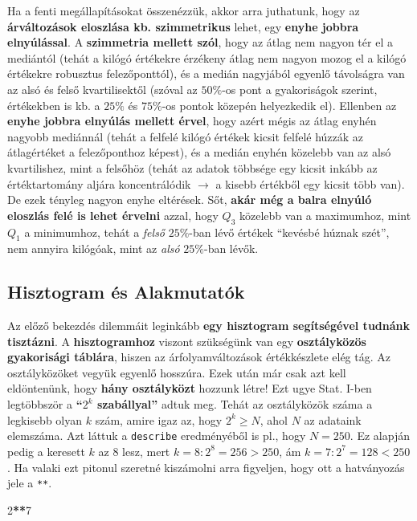 \documentclass[
]{book}
\newenvironment{Shaded}{\begin{snugshade}}{\end{snugshade}}
\newcommand{\DecValTok}[1]{\textcolor[rgb]{0.00,0.00,0.81}{#1}}
\newcommand{\OperatorTok}[1]{\textcolor[rgb]{0.81,0.36,0.00}{\textbf{#1}}}
\begin{document}
Ha a fenti megállapításokat összenézzük, akkor arra juthatunk, hogy az \textbf{árváltozások eloszlása kb. szimmetrikus} lehet, egy \textbf{enyhe jobbra elnyúlással}. A \textbf{szimmetria mellett szól}, hogy az átlag nem nagyon tér el a mediántól (tehát a kilógó értékekre érzékeny átlag nem nagyon mozog el a kilógó értékekre robusztus felezőponttól), és a medián nagyjából egyenlő távolságra van az alsó és felső kvartilisektől (szóval az \(50\%\)-os pont a gyakoriságok szerint, értékekben is kb. a \(25\%\) és \(75\%\)-os pontok közepén helyezkedik el). Ellenben az \textbf{enyhe jobbra elnyúlás mellett érvel}, hogy azért mégis az átlag enyhén nagyobb mediánnál (tehát a felfelé kilógó értékek kicsit felfelé húzzák az átlagértéket a felezőponthoz képest), és a medián enyhén közelebb van az alsó kvartilishez, mint a felsőhöz (tehát az adatok többsége egy kicsit inkább az értéktartomány aljára koncentrálódik \(\rightarrow\) a kisebb értékből egy kicsit több van). De ezek tényleg nagyon enyhe eltérések. Sőt, \textbf{akár még a balra elnyúló eloszlás felé is lehet érvelni} azzal, hogy \(Q_3\) közelebb van a maximumhoz, mint \(Q_1\) a minimumhoz, tehát a \emph{felső} \(25\%\)-ban lévő értékek ``kevésbé húznak szét'', nem annyira kilógóak, mint az \emph{alsó} \(25\%\)-ban lévők.

\subsection{Hisztogram és Alakmutatók}\label{hisztogram-uxe9s-alakmutatuxf3k}

Az előző bekezdés dilemmáit leginkább \textbf{egy hisztogram segítségével tudnánk tisztázni}. A \textbf{hisztogramhoz} viszont szükségünk van egy \textbf{osztályközös gyakorisági táblára}, hiszen az árfolyamváltozások értékkészlete elég tág. Az osztályközöket vegyük egyenlő hosszúra. Ezek után már csak azt kell eldöntenünk, hogy \textbf{hány osztályközt} hozzunk létre! Ezt ugye Stat. I-ben legtöbbször a \textbf{``\(2^k\) szabállyal''} adtuk meg. Tehát az osztályközök száma a legkisebb olyan \(k\) szám, amire igaz az, hogy \(2^k \geq N\), ahol \(N\) az adataink elemszáma. Azt láttuk a \texttt{describe} eredményéből is pl., hogy \(N=250\). Ez alapján pedig a keresett \(k\) az \(8\) lesz, mert \(k=8:2^8 = 256 >250\), ám \(k=7:2^7=128 < 250\). Ha valaki ezt pitonul szeretné kiszámolni arra figyeljen, hogy ott a hatványozás jele a \texttt{**}.

\begin{Shaded}
\begin{Highlighting}[]
\DecValTok{2}\OperatorTok{**}\DecValTok{7}
\end{Highlighting}
\end{Shaded}
\end{document}
